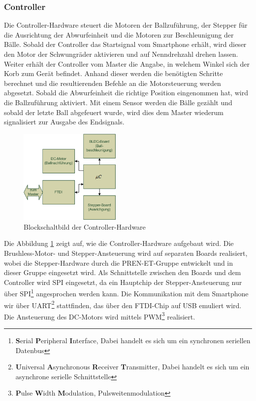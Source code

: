 \subsubsection{Controller}
\label{sec:Controller}
	Die Controller-Hardware steuert die Motoren der Ballzuführung, der Stepper für die Ausrichtung 
	der Abwurfeinheit und die Motoren zur Beschleunigung der Bälle. Sobald der Controller das Startsignal vom Smartphone erhält, 
	wird dieser den Motor der Schwungräder aktivieren und auf Nenndrehzahl drehen lassen. Weiter erhält der Controller vom Master die Angabe, 
	in welchem Winkel sich der Korb zum Gerät befindet. Anhand dieser werden die benötigten Schritte berechnet und die resultierenden Befehle 
	an die Motorsteuerung werden abgesetzt. Sobald die Abwurfeinheit die richtige Position eingenommen hat, wird die Ballzuführung aktiviert. 
	Mit einem Sensor werden die Bälle gezählt und sobald der letzte Ball abgefeuert wurde, wird dies dem Master wiederum signalisiert zur Ausgabe des Endsignals.\\
	\begin{figure}
		\centering
		\includegraphics[width=0.44\textwidth]{Enddokumentation/Loesungskonzept/Bilder/Blockschaltbild_Controller.png}
		\caption{Blockschaltbild der Controller-Hardware}
		\label{fig:Blockschaltbild_Controller}
	\end{figure}
	Die Abbildung \ref{fig:Blockschaltbild_Controller} zeigt auf, wie die Controller-Hardware aufgebaut wird. 
	Die Brushless-Motor- und Stepper-Ansteuerung wird auf separaten Boards realisiert, wobei die Stepper-Hardware durch die PREN-ET-Gruppe
	entwickelt und in dieser Gruppe eingesetzt wird. Als Schnittstelle zwischen den Boards und dem Controller wird SPI eingesetzt, 
	da ein Hauptchip der Stepper-Ansteuerung nur über SPI\footnote{\textbf{S}erial \textbf{P}eripheral \textbf{I}nterface, Dabei handelt es sich um ein synchronen seriellen Datenbus} angesprochen werden kann. Die Kommunikation mit dem Smartphone wir über UART\footnote{\textbf{U}niversal \textbf{A}synchronous \textbf{R}eceiver \textbf{T}ransmitter, Dabei handelt es sich um ein asynchrone serielle Schnittstelle} stattfinden, 
	das über den FTDI-Chip auf USB emuliert wird. Die Ansteuerung des DC-Motors wird mittels PWM\footnote{\textbf{P}ulse \textbf{W}idth \textbf{M}odulation, Pulsweitenmodulation} realisiert.